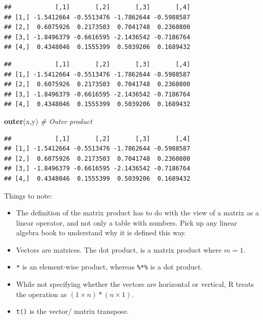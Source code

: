 \documentclass[]{book}
\newenvironment{Shaded}{\begin{snugshade}}{\end{snugshade}}
\newcommand{\KeywordTok}[1]{\textcolor[rgb]{0.13,0.29,0.53}{\textbf{#1}}}
\newcommand{\StringTok}[1]{\textcolor[rgb]{0.31,0.60,0.02}{#1}}
\newcommand{\CommentTok}[1]{\textcolor[rgb]{0.56,0.35,0.01}{\textit{#1}}}
\newcommand{\OperatorTok}[1]{\textcolor[rgb]{0.81,0.36,0.00}{\textbf{#1}}}
\newcommand{\NormalTok}[1]{#1}
\providecommand{\tightlist}{%
  \setlength{\itemsep}{0pt}\setlength{\parskip}{0pt}}
\theoremstyle{definition}
\theoremstyle{definition}
\theoremstyle{definition}
\theoremstyle{remark}
\begin{document}
\begin{Shaded}
\end{Shaded}

\begin{verbatim}
##            [,1]       [,2]       [,3]       [,4]
## [1,] -1.5412664 -0.5513476 -1.7862644 -0.5988587
## [2,]  0.6075926  0.2173503  0.7041748  0.2360800
## [3,] -1.8496379 -0.6616595 -2.1436542 -0.7186764
## [4,]  0.4348046  0.1555399  0.5039206  0.1689432
\end{verbatim}

\begin{Shaded}
\end{Shaded}

\begin{verbatim}
##            [,1]       [,2]       [,3]       [,4]
## [1,] -1.5412664 -0.5513476 -1.7862644 -0.5988587
## [2,]  0.6075926  0.2173503  0.7041748  0.2360800
## [3,] -1.8496379 -0.6616595 -2.1436542 -0.7186764
## [4,]  0.4348046  0.1555399  0.5039206  0.1689432
\end{verbatim}

\begin{Shaded}
\begin{Highlighting}[]
\KeywordTok{outer}\NormalTok{(x,y) }\CommentTok{# Outer product}
\end{Highlighting}
\end{Shaded}

\begin{verbatim}
##            [,1]       [,2]       [,3]       [,4]
## [1,] -1.5412664 -0.5513476 -1.7862644 -0.5988587
## [2,]  0.6075926  0.2173503  0.7041748  0.2360800
## [3,] -1.8496379 -0.6616595 -2.1436542 -0.7186764
## [4,]  0.4348046  0.1555399  0.5039206  0.1689432
\end{verbatim}

Things to note:

\begin{itemize}
\tightlist
\item
  The definition of the matrix product has to do with the view of a
  matrix as a linear operator, and not only a table with numbers. Pick
  up any linear algebra book to understand why it is defined this way.
\item
  Vectors are matrices. The dot product, is a matrix product where
  \(m=1\).
\item
  \texttt{*} is an element-wise product, whereas \texttt{\%*\%} is a dot
  product.
\item
  While not specifying whether the vectors are horizontal or vertical, R
  treats the operation as \((1 \times n) * (n \times 1)\).
\item
  \texttt{t()} is the vector/ matrix transpose.
\end{itemize}
\end{document}

